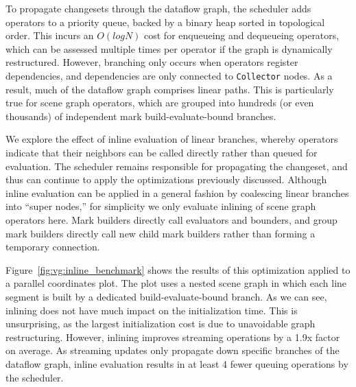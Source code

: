 To propagate changesets through the dataflow graph, the scheduler adds operators
to a priority queue, backed by a binary heap sorted in topological order. This
incurs an $O(log N)$ cost for enqueueing and dequeueing operators, which can be
assessed multiple times per operator if the graph is dynamically restructured.
However, branching only occurs when operators register dependencies, and
dependencies are only connected to \texttt{Collector} nodes. As a result, much
of the dataflow graph comprises linear paths. This is particularly true for
scene graph operators, which are grouped into hundreds (or even thousands) of
independent mark build-evaluate-bound branches.

We explore the effect of inline evaluation of linear branches, whereby operators
indicate that their neighbors can be called directly rather than queued for
evaluation. The scheduler remains responsible for propagating the changeset,
and thus can continue to apply the optimizations previously discussed. Although
inline evaluation can be applied in a general fashion by coalescing linear
branches into ``super nodes,'' for simplicity we only evaluate inlining of scene
graph operators here. Mark builders directly call evaluators and bounders, and
group mark builders directly call new child mark builders rather than forming a
temporary connection.

Figure~\ref{fig:vg:inline_benchmark} shows the results of this optimization
applied to a parallel coordinates plot. The plot uses a nested scene graph in
which each line segment is built by a dedicated build-evaluate-bound branch. As
we can see, inlining does not have much impact on the initialization time. This
is unsurprising, as the largest initialization cost is due to unavoidable graph
restructuring. However, inlining improves streaming operations by a 1.9x factor
on average. As streaming updates only propagate down specific branches of the
dataflow graph, inline evaluation results in at least 4 fewer queuing operations
by the scheduler.